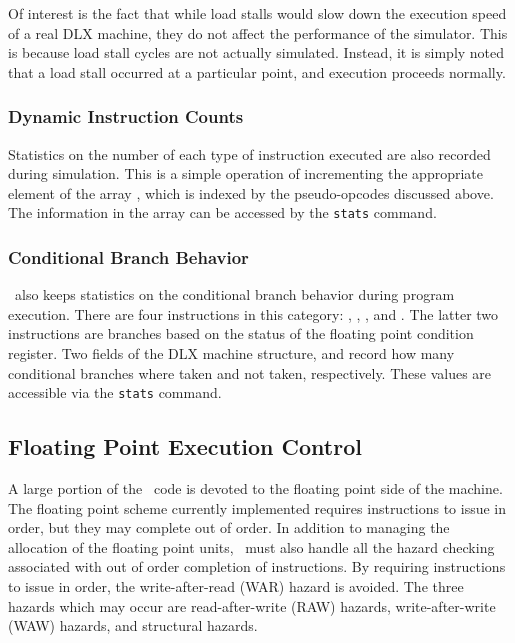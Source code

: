 Of interest is the fact that while load stalls would slow down the execution
speed of a real DLX machine, they do not affect the performance of the
simulator.  This is because load stall cycles are not actually simulated.
Instead, it is simply noted that a load stall occurred at a particular point, and
execution proceeds normally.

\subsubsection{Dynamic Instruction Counts}

Statistics on the number of each type of instruction executed are also 
recorded during simulation.  This is a simple operation of incrementing the
appropriate element of the array , which is indexed by
the pseudo-opcodes discussed above.  The information in the array can be
accessed by the {\tt stats} command.

\subsubsection{Conditional Branch Behavior}

\dlxsim\ also keeps statistics on the conditional branch behavior during
program execution.  There are four instructions in this category: 
, , , and .  The latter two
instructions are branches based on the status of the floating point
condition register.  Two fields of the DLX machine structure, 
and  record how many conditional branches where taken and
not taken, respectively.  These values are accessible via the {\tt stats}
command.

\subsection{Floating Point Execution Control}

A large portion of the \dlxsim\ code is devoted to the floating point side
of the machine.  The floating point scheme currently implemented requires
instructions to issue in order, but they may complete out of order.  In addition
to managing the allocation of the floating point units,
\dlxsim\ must also handle all the hazard checking associated with out of order
completion of instructions.  By requiring instructions to issue in order, the
write-after-read (WAR) hazard is avoided.  The three hazards which may occur
are read-after-write (RAW) hazards, write-after-write (WAW) hazards, and
structural hazards.

